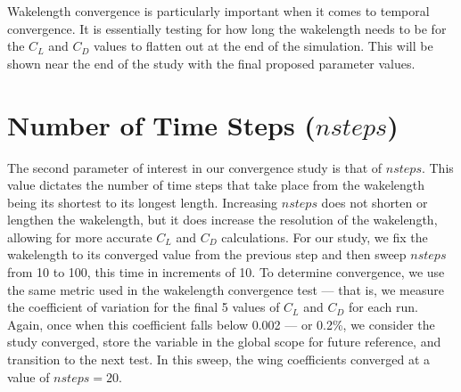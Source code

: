 \documentclass{report}
\begin{document}
Wakelength convergence is particularly important when it comes to temporal convergence. It is essentially testing for how long the wakelength needs to be for the $C_L$ and $C_D$ values to flatten out at the end of the simulation.
This will be shown near the end of the study with the final proposed parameter values.

\section{Number of Time Steps (\texorpdfstring{$nsteps$}{nsteps})}
The second parameter of interest in our convergence study is that of $nsteps$. This value dictates the number of time steps that take place from the wakelength being its shortest to its longest length.
Increasing $nsteps$ does not shorten or lengthen the wakelength, but it does increase the resolution of the wakelength, allowing for more accurate $C_L$ and $C_D$ calculations.
For our study, we fix the wakelength to its converged value from the previous step and then sweep $nsteps$ from 10 to 100, this time in increments of 10.
To determine convergence, we use the same metric used in the wakelength convergence test --- that is, we measure the coefficient of variation for the final 5 values of $C_L$ and $C_D$ for each run.
Again, once when this coefficient falls below 0.002 --- or 0.2\%, we consider the study converged, store the variable in the global scope for future reference, and transition to the next test.
In this sweep, the wing coefficients converged at a value of $nsteps = 20$.
\end{document}
